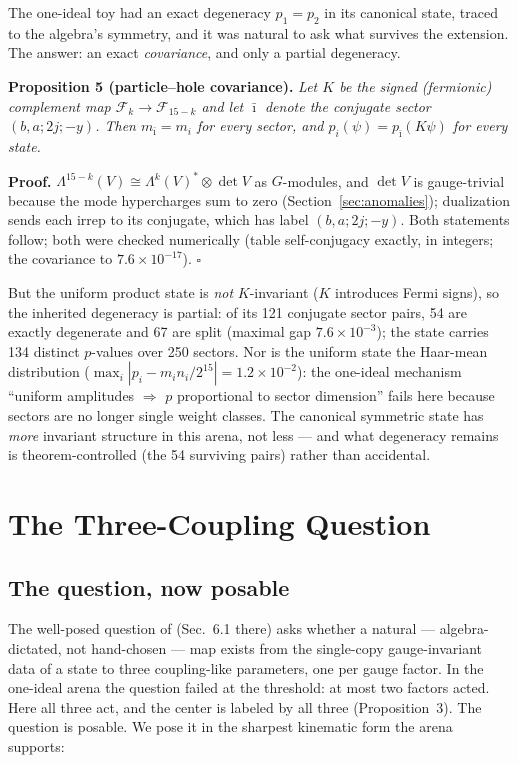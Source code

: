\documentclass[11pt]{article}
\newcommand{\Fock}{\mathcal{F}}
\begin{document}
The one-ideal toy had an exact degeneracy $p_1 = p_2$ in its canonical state, traced to the algebra's symmetry, and it was natural to ask what survives the extension. The answer: an exact \emph{covariance}, and only a partial degeneracy.

\medskip

\noindent\textbf{Proposition 5 (particle--hole covariance).} \emph{Let $K$ be the signed (fermionic) complement map $\Fock_k\to\Fock_{15-k}$ and let $\bar\imath$ denote the conjugate sector $(b,a;2j;-y)$. Then $m_{\bar\imath} = m_i$ for every sector, and $p_i(\psi) = p_{\bar\imath}(K\psi)$ for every state.}

\medskip

\noindent\textbf{Proof.} $\Lambda^{15-k}(V)\cong\Lambda^k(V)^*\otimes\det V$ as $G$-modules, and $\det V$ is gauge-trivial because the mode hypercharges sum to zero (Section~\ref{sec:anomalies}); dualization sends each irrep to its conjugate, which has label $(b,a;2j;-y)$. Both statements follow; both were checked numerically (table self-conjugacy exactly, in integers; the covariance to $7.6\times10^{-17}$). \hfill$\square$

\medskip

But the uniform product state is \emph{not} $K$-invariant ($K$ introduces Fermi signs), so the inherited degeneracy is partial: of its 121 conjugate sector pairs, 54 are exactly degenerate and 67 are split (maximal gap $7.6\times10^{-3}$); the state carries 134 distinct $p$-values over 250 sectors. Nor is the uniform state the Haar-mean distribution ($\max_i |p_i - m_in_i/2^{15}| = 1.2\times10^{-2}$): the one-ideal mechanism ``uniform amplitudes $\Rightarrow$ $p$ proportional to sector dimension'' fails here because sectors are no longer single weight classes. The canonical symmetric state has \emph{more} invariant structure in this arena, not less --- and what degeneracy remains is theorem-controlled (the 54 surviving pairs) rather than accidental.

\section{The Three-Coupling Question}\label{sec:threeparam}

\subsection{The question, now posable}

The well-posed question of \cite{p2} (Sec.~6.1 there) asks whether a natural --- algebra-dictated, not hand-chosen --- map exists from the single-copy gauge-invariant data of a state to three coupling-like parameters, one per gauge factor. In the one-ideal arena the question failed at the threshold: at most two factors acted. Here all three act, and the center is labeled by all three (Proposition~3). The question is posable. We pose it in the sharpest kinematic form the arena supports:
\end{document}

